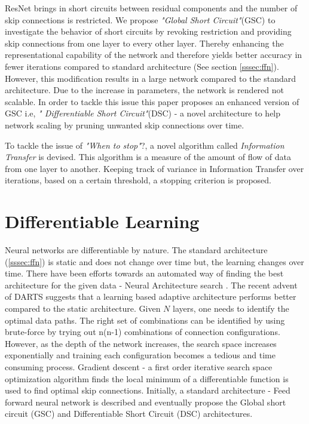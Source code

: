 \documentclass{article}
\begin{document}
ResNet brings in short circuits between residual components and the number of skip connections is restricted. We propose \emph{"Global Short Circuit"}(GSC) to investigate the behavior of short circuits by revoking restriction and providing skip connections from one layer to every other layer. Thereby enhancing the representational capability of the network and therefore yields better accuracy in fewer iterations compared to standard architecture (See section \ref{sssec:ffn}). However, this modification results in a large network compared to the standard architecture. Due to the increase in parameters, the network is rendered not scalable. In order to tackle this issue this paper proposes an enhanced version of GSC i.e, \emph{" Differentiable Short Circuit"}(DSC) - a novel architecture to help network scaling by pruning unwanted skip connections over time.

To tackle the issue of \emph{"When to stop"}?, a novel algorithm called \emph{Information Transfer} is devised. This algorithm is a measure of the amount of flow of data from one layer to another. Keeping track of variance in Information Transfer over iterations, based on a certain threshold, a stopping criterion is proposed.

\section{Differentiable Learning}
\label{sec:headings}

Neural networks are differentiable by nature. The standard architecture (\ref{sssec:ffn}) is static and does not change over time but, the learning changes over time. There have been efforts towards an automated way of finding the best architecture for the given data - Neural Architecture search \cite{Zoph2016NeuralAS}. The recent advent of DARTS \cite{Liu2019DARTSDA} suggests that a learning based adaptive architecture performs better compared to the static architecture. Given $N$ layers, one needs to identify the optimal data paths. The right set of combinations can be identified by using brute-force by trying out n(n-1) combinations of connection configurations. However, as the depth of the network increases, the search space increases exponentially and training each configuration becomes a tedious and time consuming process. Gradient descent \cite{ruder2016overview} - a first order iterative search space optimization algorithm finds the local minimum of a differentiable function is used to find optimal skip connections. Initially, a standard architecture - Feed forward neural network is described and eventually propose the Global short circuit (GSC) and Differentiable Short Circuit (DSC) architectures.
\end{document}
